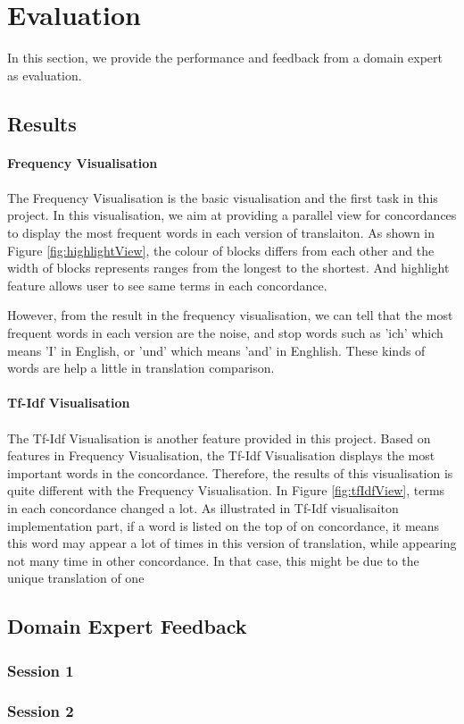 \clearpage
\section{Evaluation}
In this section, we provide the performance and feedback from a domain expert as evaluation.

\subsection{Results}
\paragraph{Frequency Visualisation}
\paragraph[]{}
The Frequency Visualisation is the basic visualisation and the first task in this project. In this visualisation, we aim at providing a parallel view for concordances to display the most frequent words in each version of translaiton. As shown in Figure \ref{fig:highlightView}, the colour of blocks differs from each other and the width of blocks represents ranges from the longest to the shortest. And highlight feature allows user to see same terms in each concordance. 

However, from the result in the frequency visualisation, we can tell that the most frequent words in each version are the noise, and stop words such as 'ich' which means 'I' in English, or 'und' which means 'and' in Enghlish. These kinds of words are help a little in translation comparison.

\paragraph{Tf-Idf Visualisation}
\paragraph[]{}The Tf-Idf Visualisation is another feature provided in this project. Based on features in Frequency Visualisation, the Tf-Idf Visualisation displays the most important words in the concordance. Therefore, the results of this visualisation is quite different with the Frequency Visualisation. In Figure \ref{fig:tfIdfView}, terms in each concordance changed a lot. As illustrated in Tf-Idf visualisaiton implementation part, if a word is listed on the top of on concordance, it means this word may appear a lot of times in this version of translation, while appearing not many time in other concordance. In that case, this might be due to the unique translation of one 

\subsection{Domain Expert Feedback}

\subsubsection{Session 1}

\subsubsection{Session 2}